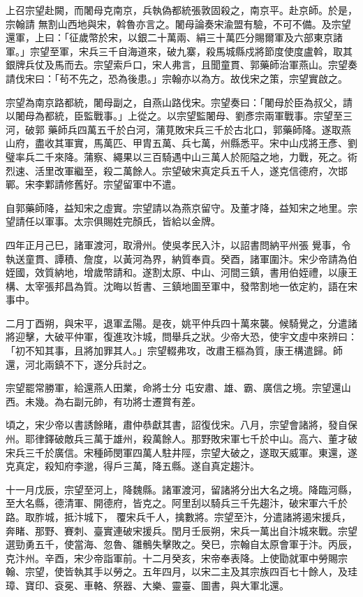 \begin{pinyinscope}
 上召宗望赴闕，而闍母克南京，兵執偽都統張敦固殺之，南京平。赴京師。於是，宗翰請
 無割山西地與宋，斡魯亦言之。闍母論奏宋渝盟有驗，不可不備。及宗望還軍，上曰：「征歲幣於宋，以銀二十萬兩、絹三十萬匹分賜爾軍及六部東京諸軍。」宗望至軍，宋兵三千自海道來，破九寨，殺馬城縣戍將節度使度盧斡，取其銀牌兵仗及馬而去。宗望索戶口，宋人弗言，且聞童貫、郭藥師治軍燕山。宗望奏請伐宋曰：「茍不先之，恐為後患。」宗翰亦以為方。故伐宋之策，宗望實啟之。



 宗望為南京路都統，闍母副之，自燕山路伐宋。宗望奏曰：「闍母於臣為叔父，請以闍母為都統，臣監戰事。」上從之。以宗望監闍母、劉彥宗兩軍戰事。宗望至三河，破郭
 藥師兵四萬五千於白河，蒲莧敗宋兵三千於古北口，郭藥師降。遂取燕山府，盡收其軍實，馬萬匹、甲胄五萬、兵七萬，州縣悉平。宋中山戍將王彥、劉璧率兵二千來降。蒲察、繩果以三百騎遇中山三萬人於阨隘之地，力戰，死之。術烈速、活里改軍繼至，殺二萬餘人。宗望破宋真定兵五千人，遂克信德府，次邯鄲。宋李鄴請修舊好。宗望留軍中不遣。



 自郭藥師降，益知宋之虛實。宗望請以為燕京留守。及董才降，益知宋之地里。宗望請任以軍事。太宗俱賜姓完顏氏，皆給以金牌。



 四年正月己巳，諸軍渡河，取滑州。使吳孝民入汴，以詔書問納平州張
 覺事，令執送童貫、譚積、詹度，以黃河為界，納質奉貢。癸酉，諸軍圍汴。宋少帝請為伯姪國，效質納地，增歲幣請和。遂割太原、中山、河間三鎮，書用伯姪禮，以康王構、太宰張邦昌為質。沈晦以哲書、三鎮地圖至軍中，發幣割地一依定約，語在宋事中。



 二月丁酉朔，與宋平，退軍孟陽。是夜，姚平仲兵四十萬來襲。候騎覺之，分遣諸將迎擊，大破平仲軍，復進攻汴城，問舉兵之狀。少帝大恐，使宇文虛中來辨曰：「初不知其事，且將加罪其人。」宗望輟弗攻，改肅王樞為質，康王構遣歸。師還，河北兩鎮不下，遂分兵討之。



 宗望罷常勝軍，給還燕人田業，命將士分
 屯安肅、雄、霸、廣信之境。宗望還山西。未幾。為右副元帥，有功將士遷賞有差。



 頃之，宋少帝以書誘餘睹，肅仲恭獻其書，詔復伐宋。八月，宗望會諸將，發自保州。耶律鐸破敵兵三萬于雄州，殺萬餘人。那野敗宋軍七千於中山。高六、董才破宋兵三千於廣信。宋種師閔軍四萬人駐井陘，宗望大破之，遂取天威軍。東還，遂克真定，殺知府李邈，得戶三萬，降五縣。遂自真定趨汴。



 十一月戊辰，宗望至河上，降魏縣。諸軍渡河，留諸將分出大名之境。降臨河縣，至大名縣，德清軍、開德府，皆克之。阿里刮以騎兵三千先趨汴，破宋軍六千於路。取胙城，抵汴城下，
 覆宋兵千人，擒數將。宗望至汴，分遣諸將遏宋援兵，奔睹、那野、賽刺、臺實連破宋援兵。閏月壬辰朔，宋兵一萬出自汴城來戰。宗望選勁勇五千，使當海、忽魯、雛鶻失擊敗之。癸巳，宗翰自太原會軍于汴。丙辰，克汴州。辛酉，宋少帝詣軍前。十二月癸亥，宋帝奉表降。上使勖就軍中勞賜宗翰、宗望，使皆執其手以勞之。五年四月，以宋二主及其宗族四百七十餘人，及珪璋、寶印、袞冕、車輅、祭器、大樂、靈臺、圖書，與大軍北還。




\end{pinyinscope}
